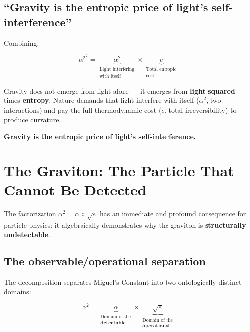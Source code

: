 \documentclass[12pt,a4paper,twoside]{article}
\newcommand{\alphaii}{\alpha^{2}}
\begin{document}
\subsection{``Gravity is the entropic price of light's self-interference''}

Combining:

\begin{conclusionbox}[title={Quadratic Synthesis}]
\begin{equation}
\alphaii^{\,2} = \underbrace{\alpha^2}_{\substack{\text{Light interfering}\\\text{with itself}}} \times \underbrace{e}_{\substack{\text{Total entropic}\\\text{cost}}}
\end{equation}

Gravity does not emerge from light alone --- it emerges from \textbf{light squared} times \textbf{entropy}. Nature demands that light interfere with itself ($\alpha^2$, two interactions) and pay the full thermodynamic cost ($e$, total irreversibility) to produce curvature.

\medskip
\textbf{Gravity is the entropic price of light's self-interference.}
\end{conclusionbox}



\section{The Graviton: The Particle That Cannot Be Detected}
\label{sec:graviton}

The factorization $\alphaii = \alpha \times \sqrt{e}$ has an immediate and profound consequence for particle physics: it algebraically demonstrates why the graviton is \textbf{structurally undetectable}.

\subsection{The observable/operational separation}

The decomposition separates Miguel's Constant into two ontologically distinct domains:

\begin{factorbox}[title={Two domains}]
\begin{equation}
\alphaii = \underbrace{\alpha}_{\substack{\text{Domain of the}\\\textbf{detectable}}} \times \underbrace{\sqrt{e}}_{\substack{\text{Domain of the}\\\textbf{operational}}}
\end{equation}
\end{factorbox}
\end{document}
